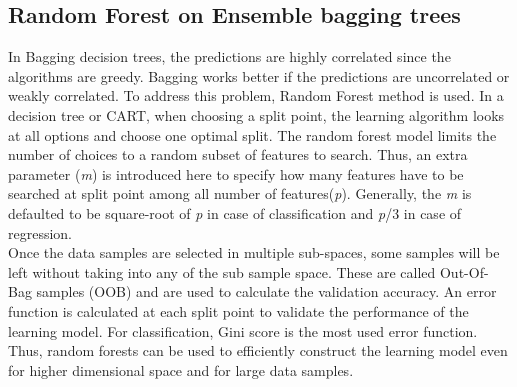 \documentclass[journal, a4paper]{IEEEtran}
\begin{document}
\subsection{Random Forest on Ensemble bagging trees}
In Bagging decision trees, the predictions are highly correlated since the algorithms are greedy. Bagging works better if the predictions are uncorrelated or weakly correlated. To address this problem, Random Forest method is used. In a decision tree or CART, when choosing a split point, the learning algorithm looks at all options and choose one optimal split. The random forest model limits the number of choices to a random subset of features to search. Thus, an extra parameter (\textit{m}) is introduced here to specify how many features have to be searched at split point among all number of features(\textit{p}). Generally, the \textit{m} is defaulted to be square-root of \textit{p} in case of classification and \textit{p}/3 in case of regression. \\
\indent Once the data samples are selected in multiple sub-spaces, some samples will be left without taking into any of the sub sample space. These are called Out-Of-Bag samples (OOB) and are used to calculate the validation accuracy. An error function is calculated at each split point to validate the performance of the learning model. For classification, Gini score is the most used error function. Thus, random forests can be used to efficiently construct the learning model even for higher dimensional space and for large data samples. 
\end{document}
